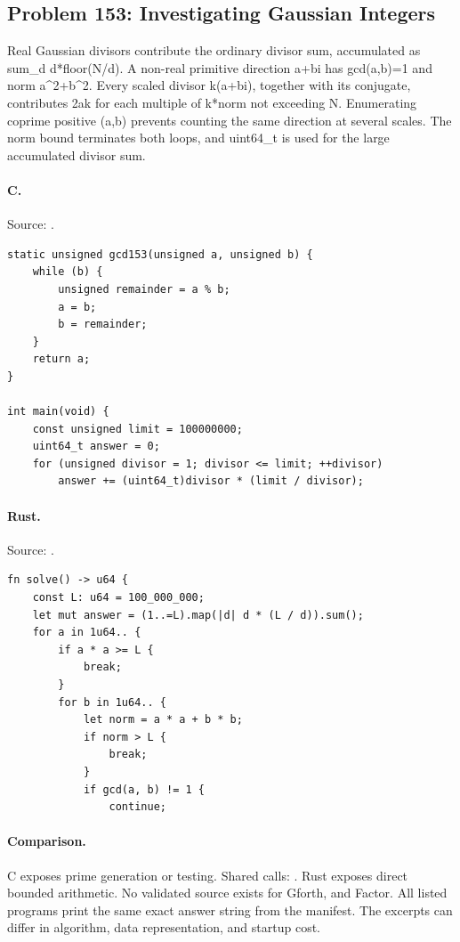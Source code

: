 \subsection{Problem 153: Investigating Gaussian Integers}
\label{walkthrough:p153}
Real Gaussian divisors contribute the ordinary divisor sum, accumulated as sum\_d d*floor(N/d). A non-real primitive direction a+bi has gcd(a,b)=1 and norm a\textasciicircum{}2+b\textasciicircum{}2. Every scaled divisor k(a+bi), together with its conjugate, contributes 2ak for each multiple of k*norm not exceeding N. Enumerating coprime positive (a,b) prevents counting the same direction at several scales. The norm bound terminates both loops, and uint64\_t is used for the large accumulated divisor sum.

\paragraph{C.} Source: .
\begin{lstlisting}
static unsigned gcd153(unsigned a, unsigned b) {
    while (b) {
        unsigned remainder = a % b;
        a = b;
        b = remainder;
    }
    return a;
}

int main(void) {
    const unsigned limit = 100000000;
    uint64_t answer = 0;
    for (unsigned divisor = 1; divisor <= limit; ++divisor)
        answer += (uint64_t)divisor * (limit / divisor);
\end{lstlisting}

\paragraph{Rust.} Source: .
\begin{lstlisting}
fn solve() -> u64 {
    const L: u64 = 100_000_000;
    let mut answer = (1..=L).map(|d| d * (L / d)).sum();
    for a in 1u64.. {
        if a * a >= L {
            break;
        }
        for b in 1u64.. {
            let norm = a * a + b * b;
            if norm > L {
                break;
            }
            if gcd(a, b) != 1 {
                continue;
\end{lstlisting}

\paragraph{Comparison.}
C exposes prime generation or testing. Shared calls: \texttt{}. Rust exposes direct bounded arithmetic.
No validated source exists for Gforth, and Factor.
All listed programs print the same exact answer string from the manifest. The excerpts can differ in algorithm, data representation, and startup cost.

